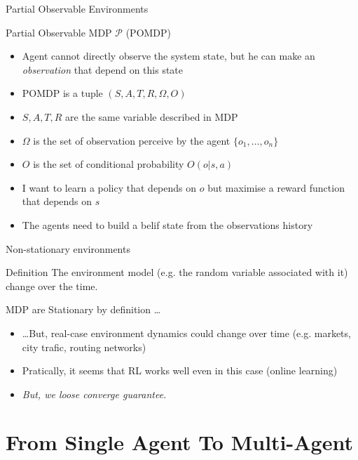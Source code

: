 \documentclass[presentation]{beamer}\mode<presentation>{\usetheme{AMSBolognaFC}}
\begin{document}
\begin{frame}{Partial Observable Environments}
	\begin{exampleblock}{Partial Observable MDP $\mathcal{P}$ (POMDP) \href{https://www.pomdp.org/}{\faLink}}
		\begin{itemize}
			\item Agent cannot directly observe the system state, but he can make an \emph{observation} that depend on this state
			\item POMDP is a tuple $(S, A, T, R, \Omega, O)$
			\item $S, A, T, R$ are the same variable described in MDP
			\item $\Omega$ is the set of observation perceive by the agent $\{o_1, \dots, o_n\}$
			\item $O$ is the set of conditional probability $O(o | s, a)$
			\item I want to learn a policy that depends on $o$ but maximise a reward function that depends on $s$
			\item The agents need to build a belif state from the observations history
		\end{itemize}
	\end{exampleblock}
\end{frame}
\begin{frame}[c]{Non-stationary environments}
	\begin{alertblock}{Definition}
		The environment model (e.g. the random variable associated with it) change 
		over the time.
	\end{alertblock}
	\begin{exampleblock}{MDP are Stationary by definition \dots}
		\begin{itemize}
			\item \dots But, real-case environment dynamics could change over time (e.g. markets, city trafic, routing networks)
			\item Pratically, it seems that RL works well even in this case (online learning)
			\item \emph{But, we loose converge guarantee.}
		\end{itemize}
	\end{exampleblock}
%
\end{frame}

\section{From Single Agent To Multi-Agent}
\end{document}
